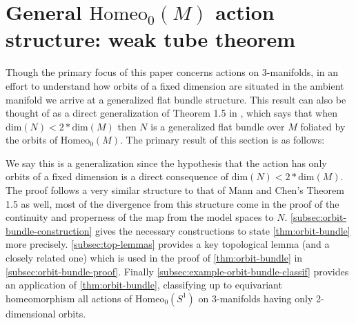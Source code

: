 \documentclass[10pt, oneside]{article}
\newcommand{\homeo}[1][S^1]{\text{Homeo}_0(#1)}
\newcommand{\dimn}[1]{\text{dim}(#1)}
\theoremstyle{definition}
\theoremstyle{definition}
\begin{document}


\section{General \texorpdfstring{$\homeo[M]$}{Homeo\_0(M)} action structure: weak tube theorem}\label{sec:orbit-bundle-lemma}
Though the primary focus of this paper concerns actions on 3-manifolds, in an effort to understand how orbits of a fixed dimension are situated in the ambient manifold we arrive at a generalized flat bundle structure. This result can also be thought of as a direct generalization of Theorem 1.5 in \cite{chen:StructureTheorems}, which says that when $\dimn{N} < 2*\dimn{M}$ then $N$ is a generalized flat bundle over $M$ foliated by the orbits of $\homeo[M]$. The primary result of this section is as follows:
\orbitbundle*

We say this is a generalization since the hypothesis that the action has only orbits of a fixed dimension is a direct consequence of $\dimn{N} < 2*\dimn{M}$. The proof follows a very similar structure to that of Mann and Chen's Theorem 1.5 as well, most of the divergence from this structure come in the proof of the continuity and properness of the map from the model spaces to $N$. \cref{subsec:orbit-bundle-construction} gives the necessary constructions to state \ref{thm:orbit-bundle} more precisely. \cref{subsec:top-lemmas} provides a key topological lemma (and a closely related one) which is used in the proof of \cref{thm:orbit-bundle} in \cref{subsec:orbit-bundle-proof}. Finally \cref{subsec:example-orbit-bundle-classif} provides an application of \cref{thm:orbit-bundle}, classifying up to equivariant homeomorphism all actions of $\homeo$ on 3-manifolds having only 2-dimensional orbits.
\end{document}

